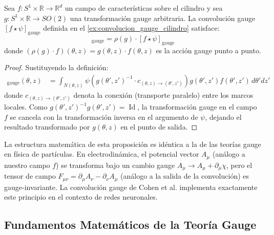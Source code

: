 \begin{proposition}\label{prop:gauge_equivarianza_cilindro}
Sea $f: S^1 \times \mathbb{R} \to \mathbb{R}^d$ un campo de características sobre el cilindro y sea $g: S^1 \times \mathbb{R} \to SO(2)$ una transformación gauge arbitraria. La convolución gauge $[f \star \psi]_{\text{gauge}}$ definida en el \autoref{ex:convolucion_gauge_cilindro} satisface:
\begin{equation}
[(\rho(g) \cdot f) \star \psi]_{\text{gauge}} = \rho(g) \cdot [f \star \psi]_{\text{gauge}}
\end{equation}
donde $(\rho(g) \cdot f)(\theta, z) = g(\theta,z) \cdot f(\theta, z)$ es la acción gauge punto a punto.
\end{proposition}

\begin{proof}
Sustituyendo la definición:
\begin{align}
[(\rho(g) \cdot f) \star \psi]_{\text{gauge}}(\theta, z) &= \int_{N(\theta,z)} \psi\left(g(\theta',z')^{-1} \cdot c_{(\theta,z) \to (\theta',z')}\right) g(\theta',z') f(\theta',z') \, d\theta' dz'
\end{align}
donde $c_{(\theta,z) \to (\theta',z')}$ denota la conexión (transporte paralelo) entre los marcos locales. Como $g(\theta',z')^{-1} g(\theta',z') = \operatorname{Id}$, la transformación gauge en el campo $f$ se cancela con la transformación inversa en el argumento de $\psi$, dejando el resultado transformado por $g(\theta,z)$ en el punto de salida.
\end{proof}

\begin{remark}
La estructura matemática de esta proposición es idéntica a la de las teorías gauge en física de partículas. En electrodinámica, el potencial vector $A_\mu$ (análogo a nuestro campo $f$) se transforma bajo un cambio gauge $A_\mu \to A_\mu + \partial_\mu \chi$, pero el tensor de campo $F_{\mu\nu} = \partial_\mu A_\nu - \partial_\nu A_\mu$ (análogo a la salida de la convolución) es gauge-invariante. La convolución gauge de Cohen et al. implementa exactamente este principio en el contexto de redes neuronales.
\end{remark}

\subsection{Fundamentos Matemáticos de la Teoría Gauge}\label{subsec:fundamentos_matematicos_gauge}

